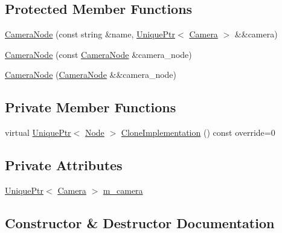 \subsection*{Protected Member Functions}
\begin{DoxyCompactItemize}
\item 
\hyperlink{classmage_1_1_camera_node_a943cecfc5f96ad22f0f64d0f7b3f3640}{Camera\+Node} (const string \&name, \hyperlink{namespacemage_a8c307fbcc33bce9b7f2aa4c26c3b95cf}{Unique\+Ptr}$<$ \hyperlink{classmage_1_1_camera}{Camera} $>$ \&\&camera)
\item 
\hyperlink{classmage_1_1_camera_node_aa0becc29c416c313ebda763edb1b2181}{Camera\+Node} (const \hyperlink{classmage_1_1_camera_node}{Camera\+Node} \&camera\+\_\+node)
\item 
\hyperlink{classmage_1_1_camera_node_af46b911ecf12ed7c3cb31fb98a590fc1}{Camera\+Node} (\hyperlink{classmage_1_1_camera_node}{Camera\+Node} \&\&camera\+\_\+node)
\end{DoxyCompactItemize}
\subsection*{Private Member Functions}
\begin{DoxyCompactItemize}
\item 
virtual \hyperlink{namespacemage_a8c307fbcc33bce9b7f2aa4c26c3b95cf}{Unique\+Ptr}$<$ \hyperlink{classmage_1_1_node}{Node} $>$ \hyperlink{classmage_1_1_camera_node_a002d3a2b41cda270a26ca5d8f3a17f55}{Clone\+Implementation} () const override=0
\end{DoxyCompactItemize}
\subsection*{Private Attributes}
\begin{DoxyCompactItemize}
\item 
\hyperlink{namespacemage_a8c307fbcc33bce9b7f2aa4c26c3b95cf}{Unique\+Ptr}$<$ \hyperlink{classmage_1_1_camera}{Camera} $>$ \hyperlink{classmage_1_1_camera_node_a18f00f7ccd0c677043e11a1b3085dbfb}{m\+\_\+camera}
\end{DoxyCompactItemize}


\subsection{Constructor \& Destructor Documentation}
\hypertarget{classmage_1_1_camera_node_ac6612668e7b9f829e371794d422d357f}{}\label{classmage_1_1_camera_node_ac6612668e7b9f829e371794d422d357f} 
